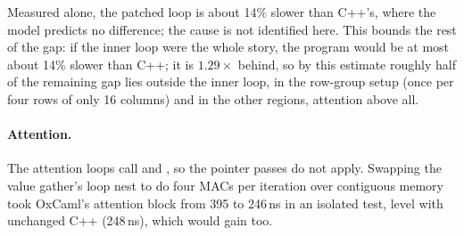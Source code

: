 Measured alone, the patched loop is about 14\% slower than C++'s, where the
model predicts no difference; the cause is not identified here. This bounds
the rest of the gap: if the inner loop were the whole story, the program would
be at most about 14\% slower than C++; it is $1.29\times$ behind, so
by this estimate roughly half of the remaining gap lies outside the inner
loop, in the
row-group setup (once per four rows of only 16 columns) and in the other
regions, attention above all.

\paragraph{Attention.} The attention loops call  and
, so the pointer passes do not apply. Swapping the value
gather's loop nest to do four MACs per iteration over contiguous memory took
OxCaml's attention block from 395 to 246\,ns in an isolated test, level with
unchanged C++ (248\,ns), which would gain too.
